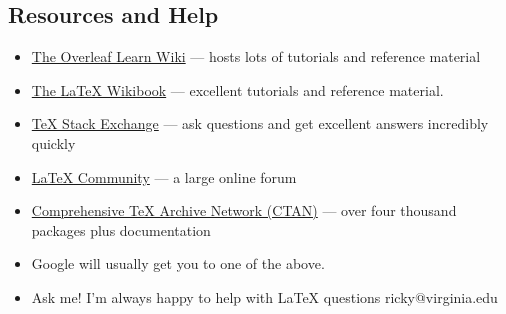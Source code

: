 \documentclass[usenames,dvipsnames]{beamer}
\begin{document}
\subsection{Resources and Help}
\begin{frame}{\insertsubsection}
\begin{itemize}
\item \href{https://www.overleaf.com/learn}{The Overleaf Learn Wiki} ---
hosts lots of tutorials and reference material
\item \href{http://en.wikibooks.org/wiki/LaTeX}{The \LaTeX{} Wikibook} ---
excellent tutorials and reference material.
\item \href{http://tex.stackexchange.com/}{\TeX{} Stack Exchange} --- ask
questions and get excellent answers incredibly quickly
\item \href{http://www.latex-community.org/}{\LaTeX{} Community} --- a large
online forum
\item \href{http://ctan.org/}{Comprehensive \TeX{} Archive Network (CTAN)} ---
over four thousand packages plus documentation
\item Google will usually get you to one of the above.
\item Ask me! I'm always happy to help with \LaTeX{} questions ricky@virginia.edu
\end{itemize}
\end{frame}

\end{document}
